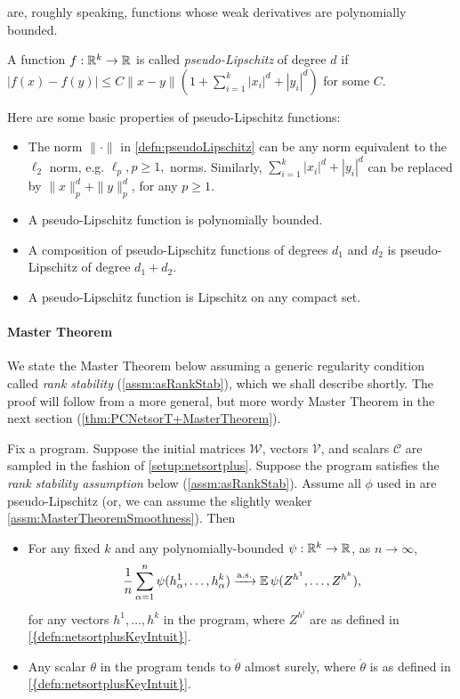 \documentclass[main.tex]{subfiles}
\begin{document}
are, roughly speaking, functions whose weak derivatives are polynomially bounded.
\begin{defn}\label{defn:pseudoLipschitz}
    A function $f: \mathbb{R}^k \to \mathbb{R}$ is called \emph{pseudo-Lipschitz} of degree $d$ if $|f(x) - f(y)| \le C\|x-y\|(1 + \sum_{i=1}^k |x_i|^d + |y_i|^d)$ for some $C$.
\end{defn}
Here are some basic properties of pseudo-Lipschitz functions:
\begin{itemize}
    \item The norm $\|\cdot\|$ in \cref{defn:pseudoLipschitz} can be any norm equivalent to the $\ell_2$ norm, e.g. $\ell_p, p\ge1,$ norms. Similarly, $\sum_{i=1}^k |x_i|^d + |y_i|^d$ can be replaced by $\|x\|^d_p + \|y\|^d_p$, for any $p \ge 1$.
    \item A pseudo-Lipschitz function is polynomially bounded.
    \item A composition of pseudo-Lipschitz functions of degrees $d_1$ and $d_2$ is pseudo-Lipschitz of degree $d_1 + d_2$.
    \item A pseudo-Lipschitz function is Lipschitz on any compact set.
\end{itemize}

\paragraph{Master Theorem}
We state the Master Theorem below assuming a generic regularity condition called \emph{rank stability} (\cref{assm:asRankStab}), which we shall describe shortly.
The proof will follow from a more general, but more wordy Master Theorem in the next section (\cref{thm:PCNetsorT+MasterTheorem}).
\begin{thm}
\label{thm:PLNetsorT+MasterTheorem} Fix a \netsortplus{} program. Suppose the initial matrices $\mathcal{W}$, vectors $\mathcal{V}$, and scalars $\mathcal{C}$ are sampled in the fashion of \cref{setup:netsortplus}.
Suppose the program satisfies the \emph{rank stability assumption} below (\cref{assm:asRankStab}).
Assume all $\phi$ used in  are pseudo-Lipschitz (or, we can assume the slightly weaker \cref{assm:MasterTheoremSmoothness}).
Then 
\begin{itemize}
\item For any fixed $k$ and any polynomially-bounded $\psi:\mathbb{R}^{k}\to\mathbb{R}$, as $n\to\infty$,
\[
\frac{1}{n}\sum_{\alpha=1}^{n}\psi(h_{\alpha}^{1},\ldots,h_{\alpha}^{k})\xrightarrow{\mathrm{a.s.}}\operatorname*{\mathbb{E}}\psi(Z^{h^{1}},\ldots,Z^{h^{k}}),
\]
for any vectors $h^{1},\ldots,h^{k}$ in the program, where $Z^{h^{i}}$ are as defined in \cref{{defn:netsortplusKeyIntuit}}.
\item Any scalar $\theta$ in the program tends to $\mathring{\theta}$ almost surely, where $\mathring{\theta}$ is as defined in \cref{{defn:netsortplusKeyIntuit}}.
\end{itemize}
\end{thm}
\end{document}
